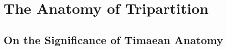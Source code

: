 
\chapter{The Anatomy of Tripartition} %
\label{cha:the_flesh_and_the_mortal_soul}

\section{On the Significance of Timaean Anatomy} %
\label{sec:the_methodological_dilemma_revisited}



